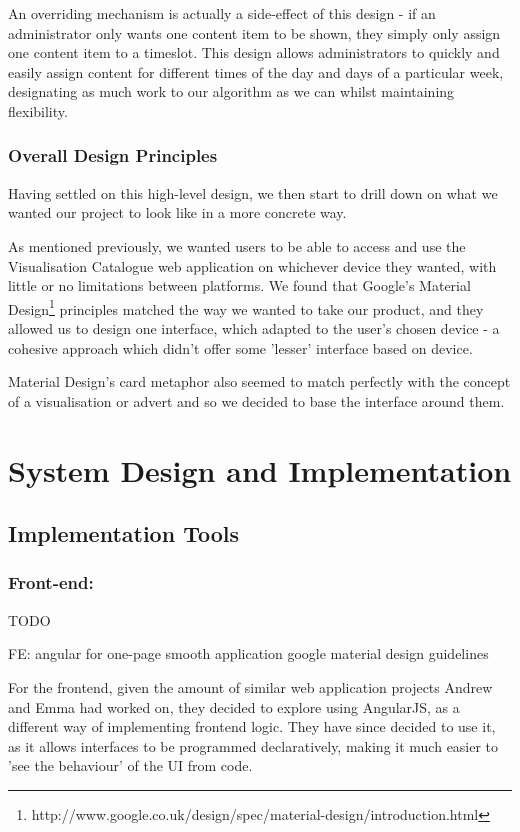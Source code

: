 \documentclass[a4paper, titlepage]{article}
\begin{document}
An overriding mechanism is actually a side-effect of this design - if an administrator only wants one content item to be shown, they simply only assign one content item to a timeslot. This design allows administrators to quickly and easily assign content for different times of the day and days of a particular week, designating as much work to our algorithm as we can whilst maintaining flexibility.

\subsubsection{Overall Design Principles}
Having settled on this high-level design, we then start to drill down on what we wanted our project to look like in a more concrete way.

As mentioned previously, we wanted users to be able to access and use the Visualisation Catalogue web application on whichever device they wanted, with little or no limitations between platforms. We found that Google's Material Design\footnote{http://www.google.co.uk/design/spec/material-design/introduction.html} principles matched the way we wanted to take our product, and they allowed us to design one interface, which adapted to the user's chosen device - a cohesive approach which didn't offer some 'lesser' interface based on device.

Material Design's card metaphor also seemed to match perfectly with the concept of a visualisation or advert and so we decided to base the interface around them.



\newpage
\section{System Design and Implementation}

\subsection{Implementation Tools}

\subsubsection{Front-end: }
TODO 

FE: 
  angular for one-page smooth application
  google material design guidelines

For the frontend, given the amount of similar web application projects Andrew and Emma had worked on, they decided to explore using AngularJS, as a different way of implementing frontend logic. They have since decided to use it, as it allows interfaces to be programmed declaratively, making it much easier to 'see the behaviour' of the UI from code.
\end{document}
